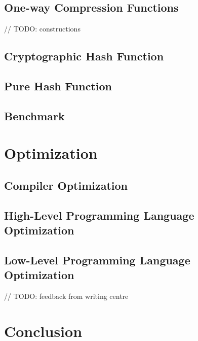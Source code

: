 \documentclass[sigconf, review=false]{acmart}
\begin{document}
\subsection{One-way Compression Functions}
// TODO: constructions


\subsection{Cryptographic Hash Function}

\subsection{Pure Hash Function}

\subsection{Benchmark}


\section{Optimization}
\subsection{Compiler Optimization}

\subsection{High-Level Programming Language Optimization}

\subsection{Low-Level Programming Language Optimization}





// TODO: feedback from writing centre

\section{Conclusion}





\end{document}
